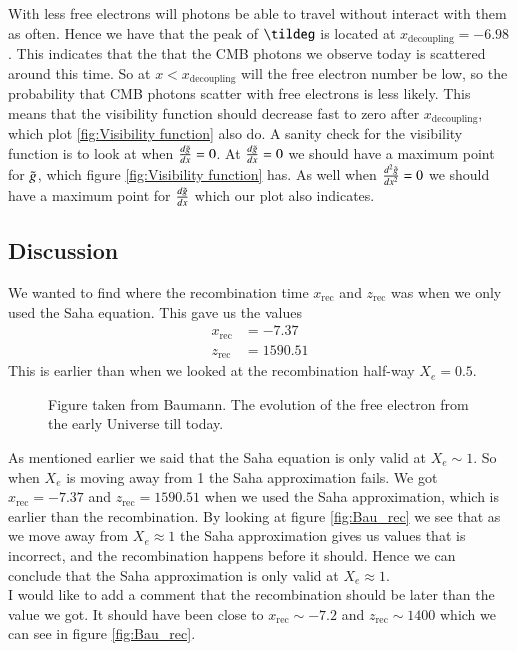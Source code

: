 \documentclass{aa}
\begin{document}
With less free electrons will photons be able to travel without interact with them as often. Hence we have that the peak of $\tildeg$ is located at $x_\text{decoupling}=-6.98$. This indicates that the that the CMB photons we observe today is scattered around this time. So at $x<x_\text{decoupling}$ will the free electron number be low, so the probability that CMB photons scatter with free electrons is less likely. This means that the visibility function should decrease fast to zero after $x_\text{decoupling}$, which plot \eqref{fig:Visibility function} also do. A sanity check for the visibility function is to look at when $\frac{d\Tilde{g}}{dx}=0$. At $\frac{d\Tilde{g}}{dx}=0$ we should have a maximum point for $\Tilde{g}$, which figure \eqref{fig:Visibility function} has. As well when $\frac{d^2\Tilde{g}}{dx^2}=0$ we should have a maximum point for $\frac{d\Tilde{g}}{dx}$ which our plot also indicates.   
\subsection{Discussion}
We wanted to find where the recombination time $x_\text{rec}$ and $z_\text{rec}$ was when we only used the Saha equation. This gave us the values 
\begin{align*}
    x_\text{rec} &=-7.37\\
    z_\text{rec}&=1590.51
\end{align*}
This is earlier than when we looked at the recombination half-way $X_e=0.5$. 
\begin{figure}[H]
  \caption{Figure taken from Baumann. The evolution of the free electron from the early Universe till today.}
  \label{fig:Bau_rec}
\end{figure}
As mentioned earlier we said that the Saha equation is only valid at $X_e\sim1$. So when $X_e$ is moving away from 1 the Saha approximation fails. We got $x_\text{rec} =-7.37$ and 
    $z_\text{rec}=1590.51$ when we used the Saha approximation, which is earlier than the recombination. By looking at figure \eqref{fig:Bau_rec} we see that as we move away from $X_e\approx1$ the Saha approximation gives us values that is incorrect, and the recombination happens before it should. Hence we can conclude that the Saha approximation is only valid at $X_e\approx1$. \\
    I would like to add a comment that the recombination should be later than the value we got. It should have been close to $x_\text{rec} \sim-7.2$ and $z_\text{rec} \sim1400$ which we can see in figure \eqref{fig:Bau_rec}.   
\clearpage
\end{document}

